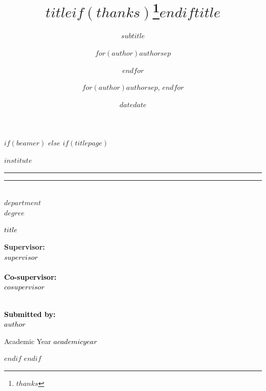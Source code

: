 \documentclass[
$if(fontsize)$
  $fontsize$,
$endif$
$if(papersize)$
  $papersize$paper,
$else$
  paper=a4,
$endif$
$if(beamer)$
  ignorenonframetext,
$if(handout)$
  handout,
$endif$
$if(aspectratio)$
  aspectratio=$aspectratio$,
$endif$
$endif$
$for(classoption)$
  $classoption$$sep$,
$endfor$
  ,captions=tableheading
]{$if(beamer)$$documentclass$$else$$if(book)$scrbook$else$scrartcl$endif$$endif$}
\title{$title$$if(thanks)$\thanks{$thanks$}$endif$}
\subtitle{$subtitle$}
\author{$for(author)$$author$$sep$ \and $endfor$}
\date{$date$}
\institute{$for(institute)$$institute$$sep$ \and $endfor$}
\title{$title$}
\author{$for(author)$$author$$sep$, $endfor$}
\date{$date$}
\begin{document}
$if(beamer)$
$else$
$if(titlepage)$
\begin{titlepage}

\begin{flushleft}
\noindent

\begin{center}
  {{\Large{\textsc{$institute$}}}} 
  \rule[0.1cm]{15.8cm}{0.1mm}
  \rule[0.5cm]{15.8cm}{0.6mm}
  \\\vspace{3mm}
  {\small{\bf $department$}}
  \\\vspace{3mm}
  {\large{$degree$}}
  \end{center}
  
  \vspace{23mm}
  
  \begin{center}\textcolor{black}{
  {\LARGE{\bf $title$}}\\
  }\end{center}
  
  \vspace{30mm} \par \noindent
  
  \begin{minipage}[t]{0.47\textwidth}
  {\large{\bf Supervisor: \vspace{2mm}\\\textcolor{black}{
  $supervisor$}\\\\
  \textcolor{black}{
  \bf Co-supervisor:\vspace{2mm}\\\textcolor{black}{
  $cosupervisor$\\\\}}}}
  \end{minipage}
  \hfill
  \begin{minipage}[t]{0.47\textwidth}\raggedleft \textcolor{black}{
  {\large{\bf Submitted by:
  \vspace{2mm}\\
  \textcolor{black}{
  $author$}}}
  }
  \end{minipage}
  
  \vspace{40mm}
  
  \begin{center}
  Academic Year \textcolor{black}{ $academicyear$}
  \end{center}

\end{flushleft}
\end{titlepage}
\restoregeometry
{}
$endif$
$endif$
\end{document}
